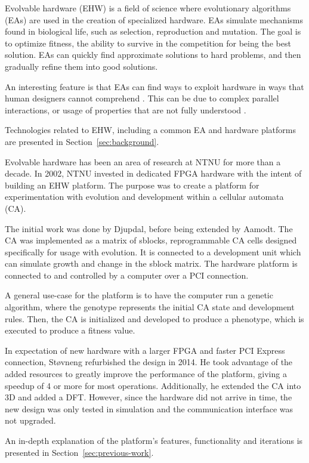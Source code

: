 Evolvable hardware (EHW) is a field of science where evolutionary algorithms (EAs) are used in the creation of specialized hardware.
EAs simulate mechanisms found in biological life, such as selection, reproduction and mutation.
The goal is to optimize fitness, the ability to survive in the competition for being the best solution.
EAs can quickly find approximate solutions to hard problems, and then gradually refine them into good solutions.

An interesting feature is that EAs can find ways to exploit hardware in ways that human designers cannot comprehend \cite{thompson1997evolved}.
This can be due to complex parallel interactions, or usage of properties that are not fully understood \cite{thompson1999analysis}.

Technologies related to EHW, including a common EA and hardware platforms are presented in Section~\ref{sec:background}.

Evolvable hardware has been an area of research at NTNU for more than a decade.
In 2002, NTNU invested in dedicated FPGA hardware with the intent of building an EHW platform.
The purpose was to create a platform for experimentation with evolution and development within a cellular automata (CA).

The initial work was done by Djupdal, before being extended by Aamodt.
The CA was implemented as a matrix of sblocks, reprogrammable CA cells designed specifically for usage with evolution.
It is connected to a development unit which can simulate growth and change in the sblock matrix.
The hardware platform is connected to and controlled by a computer over a PCI connection.

A general use-case for the platform is to have the computer run a genetic algorithm, where the genotype represents the initial CA state and development rules.
Then, the CA is initialized and developed to produce a phenotype, which is executed to produce a fitness value.

In expectation of new hardware with a larger FPGA and faster PCI Express connection, Støvneng refurbished the design in 2014.
He took advantage of the added resources to greatly improve the performance of the platform, giving a speedup of 4 or more for most operations.
Additionally, he extended the CA into 3D and added a DFT.
However, since the hardware did not arrive in time, the new design was only tested in simulation and the communication interface was not upgraded.

An in-depth explanation of the platform's features, functionality and iterations is presented in Section~\ref{sec:previous-work}.

